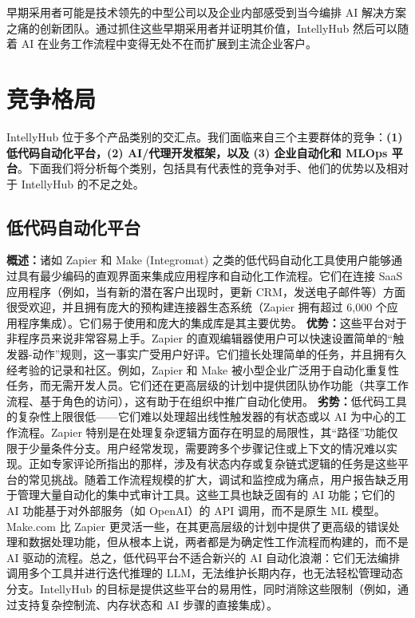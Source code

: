 \documentclass[11pt, a4paper, oneside]{article}
\begin{document}
早期采用者可能是技术领先的中型公司以及企业内部感受到当今编排 AI 解决方案之痛的创新团队。通过抓住这些早期采用者并证明其价值，IntellyHub 然后可以随着 AI 在业务工作流程中变得无处不在而扩展到主流企业客户。

\section{竞争格局}

IntellyHub 位于多个产品类别的交汇点。我们面临来自三个主要群体的竞争：\textbf{(1) 低代码自动化平台，(2) AI/代理开发框架，以及 (3) 企业自动化和 MLOps 平台}。下面我们将分析每个类别，包括具有代表性的竞争对手、他们的优势以及相对于 IntellyHub 的不足之处。

\subsection{低代码自动化平台}

\textbf{概述：}诸如 Zapier 和 Make (Integromat) 之类的低代码自动化工具使用户能够通过具有最少编码的直观界面来集成应用程序和自动化工作流程。它们在连接 SaaS 应用程序（例如，当有新的潜在客户出现时，更新 CRM，发送电子邮件等）方面很受欢迎，并且拥有庞大的预构建连接器生态系统（Zapier 拥有超过 6,000 个应用程序集成\cite{zapierApps}）。它们易于使用和庞大的集成库是其主要优势。
\newline\newline
\textbf{优势：}这些平台对于非程序员来说非常容易上手。Zapier 的直观编辑器使用户可以快速设置简单的“触发器-动作”规则，这一事实广受用户好评\cite{g2ZapierReviews}。它们擅长处理简单的任务，并且拥有久经考验的记录和社区。例如，Zapier 和 Make 被小型企业广泛用于自动化重复性任务，而无需开发人员。它们还在更高层级的计划中提供团队协作功能（共享工作流程、基于角色的访问），这有助于在组织中推广自动化使用\cite{zapierPricing}。
\newline\newline
\textbf{劣势：}低代码工具的复杂性上限很低——它们难以处理超出线性触发器的有状态或以 AI 为中心的工作流程。Zapier 特别是在处理复杂逻辑方面存在明显的局限性，其“路径”功能仅限于少量条件分支。用户经常发现，需要跨多个步骤记住或上下文的情况难以实现。正如专家评论所指出的那样，涉及有状态内存或复杂链式逻辑的任务是这些平台的常见挑战。随着工作流程规模的扩大，调试和监控成为痛点，用户报告缺乏用于管理大量自动化的集中式审计工具\cite{g2ZapierReviews}。这些工具也缺乏固有的 AI 功能；它们的 AI 功能基于对外部服务（如 OpenAI）的 API 调用，而不是原生 ML 模型\cite{zapierOpenAI}。Make.com 比 Zapier 更灵活一些，在其更高层级的计划中提供了更高级的错误处理和数据处理功能\cite{g2MakeVsZapier}，但从根本上说，两者都是为确定性工作流程而构建的，而不是 AI 驱动的流程。总之，低代码平台不适合新兴的 AI 自动化浪潮：它们无法编排调用多个工具并进行迭代推理的 LLM，无法维护长期内存，也无法轻松管理动态分支。IntellyHub 的目标是提供这些平台的易用性，同时消除这些限制（例如，通过支持复杂控制流、内存状态和 AI 步骤的直接集成）。
\end{document}
